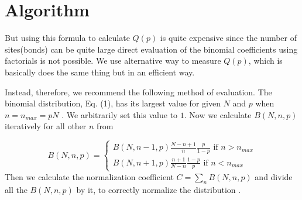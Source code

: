 	

	
\section{Algorithm}
	But using this formula to calculate $Q(p)$ is quite expensive since the number of sites(bonds) can be quite large  direct evaluation of the binomial coefficients using factorials is not possible. We use alternative way to measure $Q(p)$, which is basically does the same thing but in an efficient way.
 
	Instead, therefore, we recommend the following method of evaluation. The binomial distribution, Eq. (1), has its largest value for given $N$ and $p$ when $n = n_{max} = p N$ . We arbitrarily set this value to $1$. Now we calculate $B(N, n, p)$ iteratively for all other $n$ from
	
	\begin{equation*}
	B(N,n,p) = 
	\begin{cases}
		B(N, n-1, p) \frac{N-n+1}{n} \frac{p}{1-p}  \text{ if } n > n_{max}\\
		B(N, n+1, p) \frac{n+1}{N-n} \frac{1-p}{p}  \text{ if } n < n_{max}
	\end{cases}   
	\end{equation*}
	Then we calculate the normalization coefficient $C = \sum_{n} B(N, n, p)$ and divide all the $B(N, n, p)$ by it, to correctly normalize the distribution 	\cite{Newman2000, Newman2001}.
	
